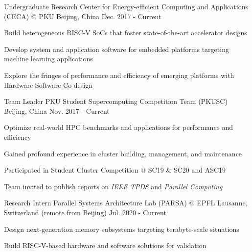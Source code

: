 

\begin{cventries}

  \cventry
    {Undergraduate Research} %
    {Center for Energy-efficient Computing and Applications (CECA) @ PKU} %
    {Beijing, China} %
    {Dec. 2017 - Current} %
    {
      \begin{cvitems} %
        \item {Build heterogeneous RISC-V SoCs that foster state-of-the-art accelerator designs}
        \item {Develop system and application software for embedded platforms targeting machine learning applications}
        \item {Explore the fringes of performance and efficiency of emerging platforms with Hardware-Software Co-design}
      \end{cvitems}
    }

  \cventry
    {Team Leader} %
    {PKU Student Supercomputing Competition Team (PKUSC)} %
    {Beijing, China} %
    {Nov. 2017 - Current} %
    {
      \begin{cvitems} %
        \item {Optimize real-world HPC benchmarks and applications for performance and efficiency}
        \item {Gained profound experience in cluster building, management, and maintenance}
        \item {Participated in Student Cluster Competition @ SC19 \& SC20 and ASC19}
        \item {Team invited to publish reports on \textit{IEEE TPDS} and \textit{Parallel Computing}}
      \end{cvitems}
    }

  \cventry
    {Research Intern} %
    {Parallel Systems Architecture Lab (PARSA) @ EPFL} %
    {Lausanne, Switzerland \newline (remote from Beijing)} %
    {Jul. 2020 - Current} %
    {
      \begin{cvitems} %
        \item {Design next-generation memory subsystems targeting terabyte-scale situations}
        \item {Build RISC-V-based hardware and software solutions for validation}
      \end{cvitems}
    }


\end{cventries}
